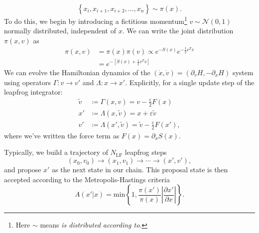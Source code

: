 \documentclass[a4paper,11pt]{article}
\begin{document}
%
%
\begin{equation}
\left\{x_{i}, x_{i+1}, x_{i+2}, \ldots, x_{n}\right\} \sim \pi(x).
\end{equation}
%
To do this, we begin by introducing a fictitious momentum\footnote{Here $\sim$
means \textit{is distributed according to}.} $v \sim \mathcal{N}(0, 1)$
normally distributed, independent of $x$.
%
We can write the joint distribution $\pi(x, v)$ as
%
\begin{align}
\pi(x, v) &= \pi(x) \pi(v) \propto e^{-S(x)} e^{-\frac{1}{2} v^{T}v} \\
&= e^{-\left[S(x) + \frac{1}{2} v^{T} v \right]}
\end{align}
%
We can evolve the Hamiltonian dynamics of the $(\dot{x}, \dot{v}) =
(\partial_{v} H, -\partial_{x} H)$ system using operators $\Gamma: v
\rightarrow v'$ and $\Lambda: x \rightarrow x'$.
%
Explicitly, for a single update step of the leapfrog integrator:
%
\begin{align}
\tilde{v} &\coloneqq \Gamma(x, v) = v - \frac{\varepsilon}{2} F(x) \\
x' &\coloneqq \Lambda(x, \tilde{v}) = x + \varepsilon \tilde{v} \\
v' &\coloneqq \Lambda(x', \tilde{v}) = \tilde{v} - \frac{\varepsilon}{2} F(x'),
\end{align}
%
where we've written the force term as $F(x) = \partial_{x}S(x)$.
%

Typically, we build a trajectory of $N_{\mathrm{LF}}$ leapfrog steps
%
\begin{equation}
(x_{0}, v_{0}) \rightarrow (x_{1}, v_{1}) \rightarrow \cdots \rightarrow (x', v'),
\end{equation}
%
and propose $x'$ as the next state in our chain.
%
This proposal state is then accepted according to the Metropolis-Hastings
criteria~\cite{robert_metropolis-hastings_2016}
%
\begin{equation}
A(x'|x) = \mathrm{min}\left\{{1, \frac{\pi(x')}{\pi(x)} \left| \frac{\partial x'}{\partial x} \right|}\right\}.
\end{equation}
%
\end{document}
